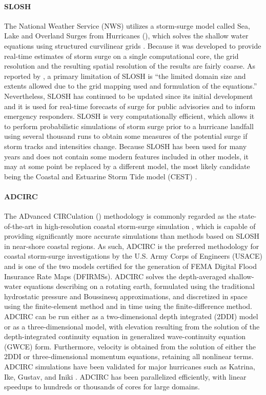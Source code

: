 \paragraph{SLOSH} The National Weather Service (NWS) utilizes a storm-surge model called Sea, Lake and Overland Surges from Hurricanes (), which solves the shallow water equations using structured curvilinear grids \citep{jelesnianski1992NWS48}. Because it was developed to provide real-time estimates of storm surge on a single computational core, the grid resolution and the resulting spatial resolution of the results are fairly coarse. As reported by \citet{mandli2014adaptive}, a primary limitation of SLOSH is ``the limited domain size and extents allowed due to the grid mapping used and formulation of the equations.'' Nevertheless, SLOSH has continued to be updated since its initial development and it is used for real-time forecasts of surge for public advisories and to inform emergency responders. SLOSH is very computationally efficient, which allows it to perform probabilistic simulations of storm surge prior to a hurricane landfall using several thousand runs to obtain some measures of the potential surge if storm tracks and intensities change. Because SLOSH has been used for many years and does not contain some modern features included in other models, it may at some point be replaced by a different model, the most likely candidate being the Coastal and Estuarine Storm Tide model (CEST) \citep{zhang2017transition}. 

\paragraph{ADCIRC} The ADvanced CIRCulation () methodology is commonly regarded as the state-of-the-art in high-resolution coastal storm-surge simulation \citep{luettich1992adcirc}, which is capable of providing significantly more accurate simulations than methods based on SLOSH \citep{resio2008modeling} in near-shore coastal regions. As such, ADCIRC is the preferred methodology for coastal storm-surge investigations by the U.S. Army Corps of Engineers (USACE) and is one of the two models certified for the generation of FEMA Digital Flood Insurance Rate Maps (DFIRMSs). ADCIRC solves the depth-averaged shallow-water equations describing on a rotating earth, formulated using the traditional hydrostatic pressure and Boussinesq approximations, and discretized in space using the finite-element method and in time using the finite-difference method. ADCIRC can be run either as a two-dimensional depth integrated (2DDI) model or as a three-dimensional model, with elevation resulting from the solution of the depth-integrated continuity equation in generalized wave-continuity equation (GWCE) form. Furthermore, velocity is obtained from the solution of either the 2DDI or three-dimensional momentum equations, retaining all nonlinear terms. ADCIRC simulations have been validated for major hurricanes such as Katrina, Ike, Gustav, and Iniki \citep{kennedy2011origin, kennedy2012tropical}. ADCIRC has been parallelized efficiently, with linear speedups to hundreds or thousands of cores for large domains. 

